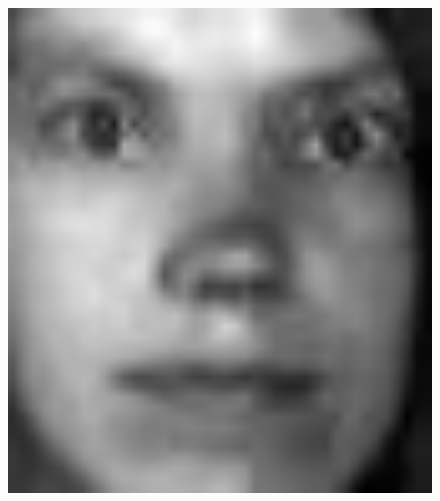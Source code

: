 \documentclass[english,onecolumn]{IEEEtran}
\begin{document}
\begin{enumerate}
\begin{enumerate}
\begin{figure}[htbp]
{\begin{minipage}[t]{0.22\linewidth}
                \includegraphics[width=1\textwidth]{figures/p4/problem2/projectface_10_d-2.jpg}
                \end{minipage}
            }
\end{figure}
\end{enumerate}
\end{enumerate}
\end{document}
